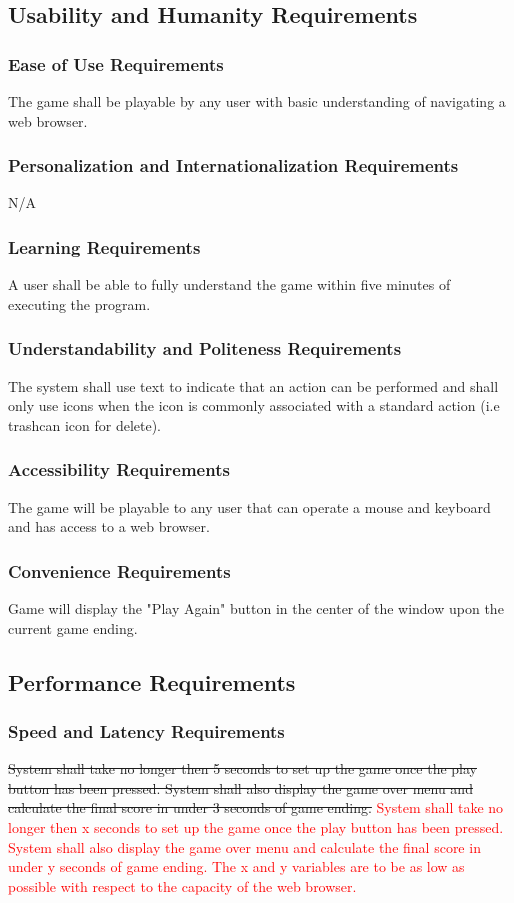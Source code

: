 \documentclass[12pt, titlepage]{article}
\begin{document}
\subsection{Usability and Humanity Requirements}
\subsubsection{Ease of Use Requirements}
The game shall be playable by any user with basic understanding of navigating a web browser.
\subsubsection{Personalization and Internationalization Requirements}
N/A
\subsubsection{Learning Requirements}
A user shall be able to fully understand the game within five minutes of executing the program.
\subsubsection{Understandability and Politeness Requirements }
The system shall use text to indicate that an action can be performed and shall only use icons when the icon is commonly associated with a standard action (i.e trashcan icon for delete).
\subsubsection{Accessibility Requirements}
The game will be playable to any user that can operate a mouse and keyboard and has access to a web browser.
\subsubsection{Convenience Requirements}
Game will display the "Play Again" button in the center of the window upon the current game ending.


\subsection{Performance Requirements}
\subsubsection{Speed and Latency Requirements}
\sout{System shall take no longer then 5 seconds to set up the game once the play button has been pressed. System shall also display the game over menu and calculate the final score in under 3 seconds of game ending.}
\textcolor{red}{System shall take no longer then x seconds to set up the game once the play button has been pressed. System shall also display the game over menu and calculate the final score in under y seconds of game ending. The x and y variables are to be as low as possible with respect to the capacity of the web browser.}
\end{document}
